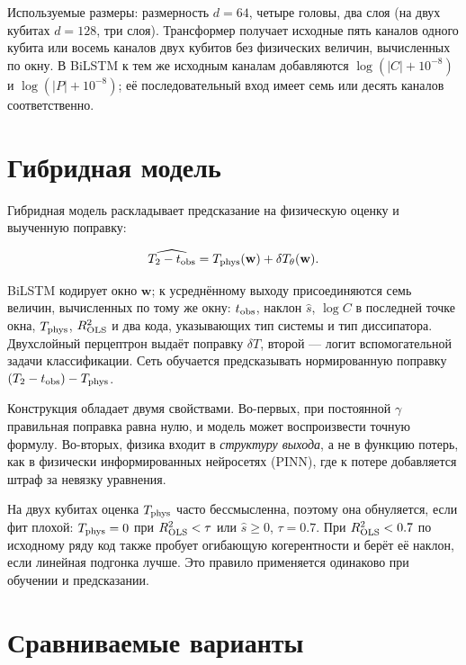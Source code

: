 \documentclass[12pt,a4paper]{report}
\numberwithin{equation}{chapter}
\begin{document}
Используемые размеры: размерность $d=64$, четыре головы, два слоя (на двух
кубитах $d=128$, три слоя). Трансформер получает исходные пять каналов одного
кубита или восемь каналов двух кубитов без физических величин, вычисленных
по окну. В BiLSTM к тем же исходным каналам добавляются $\log(|C|+10^{-8})$
и $\log(|P|+10^{-8})$; её последовательный вход имеет семь или десять
каналов соответственно.

\section{Гибридная модель}
\label{sec:resid}

Гибридная модель раскладывает предсказание на физическую оценку и
выученную поправку:
\begin{keybox}
\begin{equation}
\widehat{T_2-t_{\rm obs}}=T_{\rm phys}(\mathbf w)+\delta T_\theta(\mathbf w).
\label{eq:residual}
\end{equation}
\end{keybox}
BiLSTM кодирует окно $\mathbf w$; к усреднённому выходу присоединяются семь
величин, вычисленных по тому же окну: $t_{\rm obs}$, наклон $\hat s$,
$\log C$ в последней точке окна, $T_{\rm phys}$, $R^2_{\rm OLS}$ и два кода, указывающих
тип системы и тип диссипатора. Двухслойный перцептрон выдаёт поправку
$\delta T$, второй --- логит вспомогательной задачи классификации. Сеть
обучается предсказывать нормированную поправку
$(T_2-t_{\rm obs})-T_{\rm phys}$.

Конструкция обладает двумя свойствами. Во-первых, при постоянной $\gamma$
правильная поправка равна нулю, и модель может воспроизвести точную формулу.
Во-вторых, физика входит в \emph{структуру выхода}, а не в функцию потерь, как в
физически информированных нейросетях (PINN), где к потере добавляется штраф
за невязку уравнения.

На двух кубитах оценка $T_{\rm phys}$ часто бессмысленна, поэтому она
обнуляется, если фит плохой: $T_{\rm phys}=0$ при $R^2_{\rm OLS}<\tau$ или
$\hat s\ge0$, $\tau=0.7$. При $R^2_{\rm OLS}<0.7$ по исходному ряду код также
пробует огибающую когерентности и берёт её наклон, если линейная подгонка
лучше. Это правило применяется одинаково при обучении и предсказании.

\section{Сравниваемые варианты}
\end{document}
